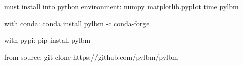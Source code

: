must install into python environment:
numpy
matplotlib.pyplot
time
pylbm 


with conda:
conda install pylbm -c conda-forge

with pypi:
pip install pylbm

from source:
git clone https://github.com/pylbm/pylbm